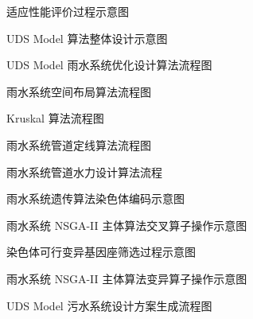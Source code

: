 \documentclass[degree=doctor]{sysuthesis}
\begin{document}
\clearpage
\setcounter{page}{83}
\begin{figure}
  \centering
  \caption{适应性能评价过程示意图}
\end{figure}

\clearpage
\setcounter{page}{91}
\begin{figure}
  \centering
  \caption{UDS Model 算法整体设计示意图}
\end{figure}

\clearpage
\setcounter{page}{93}
\begin{figure}
  \centering
  \caption{UDS Model 雨水系统优化设计算法流程图}
\end{figure}

\clearpage
\setcounter{page}{94}
\begin{figure}
  \centering
  \caption{雨水系统空间布局算法流程图}
\end{figure}

\begin{figure}
  \centering
  \caption{Kruskal 算法流程图}
\end{figure}

\clearpage
\setcounter{page}{95}
\begin{figure}
  \centering
  \caption{雨水系统管道定线算法流程图}
\end{figure}

\begin{figure}
  \centering
  \caption{雨水系统管道水力设计算法流程}
\end{figure}

\clearpage
\setcounter{page}{97}
\begin{figure}
  \centering
  \caption{雨水系统遗传算法染色体编码示意图}
\end{figure}

\begin{figure}
  \centering
  \caption{雨水系统 NSGA-II 主体算法交叉算子操作示意图}
\end{figure}

\clearpage
\setcounter{page}{98}
\begin{figure}
  \centering
  \caption{染色体可行变异基因座筛选过程示意图}
\end{figure}

\begin{figure}
  \centering
  \caption{雨水系统 NSGA-II 主体算法变异算子操作示意图}
\end{figure}

\clearpage
\setcounter{page}{100}
\begin{figure}
  \centering
  \caption{UDS Model 污水系统设计方案生成流程图}
\end{figure}
\end{document}
